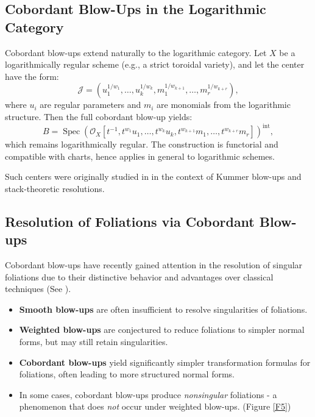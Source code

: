 \documentclass{amsart}
\newcommand{\cJ}{{\mathcal J}}
\newcommand{\cO}{{\mathcal O}}
\newcommand{\Spec}{\operatorname{Spec}}
\begin{document}
\subsection{Cobordant Blow-Ups in the Logarithmic Category}

Cobordant blow-ups extend naturally to the logarithmic category. Let \( X \) be a logarithmically regular scheme (e.g., a strict toroidal variety), and let the center have the form:
\[
\cJ = (u_1^{1/w_1}, \ldots, u_k^{1/w_k}, m_1^{1/w_{k+1}}, \ldots, m_r^{1/w_{k+r}}),
\]
where \( u_i \) are regular parameters and \( m_i \) are monomials from the logarithmic structure. Then the full cobordant blow-up yields:
\[
B = \Spec\left( \cO_X[t^{-1}, t^{w_1}u_1, \ldots, t^{w_k}u_k, t^{w_{k+1}}m_1, \ldots, t^{w_{k+r}}m_r] \right)^{\text{int}},
\]
which remains logarithmically regular. The construction is functorial and compatible with charts, hence applies in general to logarithmic schemes.

Such centers were originally studied in \cite{ATW-principalization, ATW-relative, ATW-weighted,Quek} in the context of Kummer blow-ups and stack-theoretic resolutions. 



\subsection{ Resolution of Foliations via Cobordant Blow-ups}\label{foliations}

Cobordant blow-ups have recently gained attention in the resolution of singular foliations due to their distinctive behavior and advantages over classical techniques (See \cite{ABTW25}).

\begin{itemize}
    \item \textbf{Smooth blow-ups} are often insufficient to resolve singularities of foliations.
    \item \textbf{Weighted blow-ups} are conjectured to reduce foliations to simpler normal forms, but may still retain singularities.
    \item \textbf{Cobordant blow-ups} yield significantly simpler transformation formulas for foliations, often leading to more structured normal forms.
    \item In some cases, cobordant blow-ups produce \emph{nonsingular} foliations - a phenomenon that does \emph{not} occur under weighted blow-ups. (Figure \ref{F5})
\end{itemize}
\end{document}
